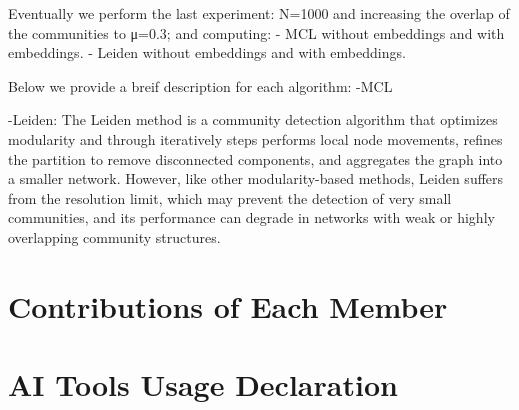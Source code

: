 \documentclass[a4paper,11pt]{article}
\begin{document}
Eventually we perform the last experiment: N=1000 and increasing the overlap of the communities to μ=0.3; and computing:
- MCL without embeddings and with embeddings.
- Leiden without embeddings and with embeddings.

Below we provide a breif description for each algorithm:
-MCL




-Leiden:
The Leiden method is a community detection algorithm that optimizes modularity and through iteratively steps performs local node movements, 
refines the partition to remove disconnected components, and aggregates the graph into a smaller network.
However, like other modularity-based methods, Leiden suffers from the resolution limit, which may prevent the detection of very small communities, 
and its performance can degrade in networks with weak or highly overlapping community structures. 



\newpage

\section*{Contributions of Each Member}



\section*{AI Tools Usage Declaration}
\end{document}
